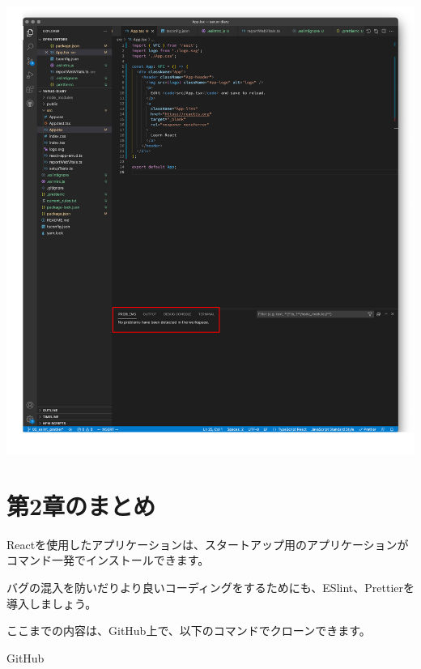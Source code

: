 \begin{reviewimage}[H]%
\includegraphics[width=1.0\maxwidth]{./images/02-create-react-app/06_eslint_prettier_fixdoneAll.png}%
\label{image:02-create-react-app:06_eslint_prettier_fixdoneAll}
\end{reviewimage}

\section{第2章のまとめ}
\keeplastskip{
  \label{sec:2-6}
  \label{sec-chap02review}
  \par\nobreak
}

Reactを使用したアプリケーションは、スタートアップ用のアプリケーションがコマンド一発でインストールできます。

\vspace*{\baselineskip}

バグの混入を防いだりより良いコーディングをするためにも、ESlint、Prettierを導入しましょう。

\begin{starternote}[]{}

ここまでの内容は、GitHub上で、以下のコマンドでクローンできます。

\def\startercodeblockfontsize{}
\begin{starterterminal}[]{GitHub}\end{starterterminal}
\end{starternote}
